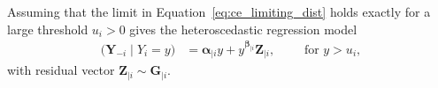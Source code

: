 \documentclass[12pt]{article}
\DeclareMathOperator{\CE}{\mathrm{CE}}
\begin{document}
Assuming that the limit in Equation~\eqref{eq:ce_limiting_dist} holds exactly for a large threshold $u_i > 0$ gives the heteroscedastic regression model
\begin{align}~\label{eq:ce_model}
  \bigl(\symbf{Y}_{-i} \mid Y_i = y \bigr) &= \symbf{\alpha}_{\mid i}y + y^{\symbf{\beta}_{\mid i}}\symbf{Z}_{\mid i},\qquad \text{ for } y > u_i,
\end{align}
with residual vector $\symbf{Z}_{\mid i} \sim \symbf{G}_{\mid i}$.
\end{document}
